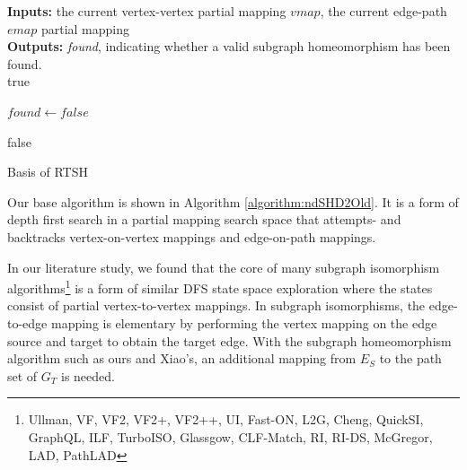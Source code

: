 \begin{algorithm}
\DontPrintSemicolon
\SetAlgoLined
\LinesNumbered
\textbf{Inputs: } the current vertex-vertex partial mapping $\mathit{vmap}$, the current edge-path $\mathit{emap}$ partial mapping\\
\textbf{Outputs: } \textit{found}, indicating whether a valid subgraph homeomorphism has been found.\\

 {
	\Return true\;
}

$\mathit{found} \longleftarrow \mathit{false}$

 \Return false\;
 \caption{Basis of RTSH}
 \label{algorithm:ndSHD2Old}
\end{algorithm}






Our base algorithm is shown in Algorithm \ref{algorithm:ndSHD2Old}. It is a form of depth first search in a partial mapping search space that attempts- and backtracks vertex-on-vertex mappings and edge-on-path mappings.

In our literature study, we found that the core of many subgraph isomorphism algorithms\footnote{Ullman, VF, VF2, VF2+, VF2++, UI, Fast-ON, L2G, Cheng, QuickSI, GraphQL, ILF, TurboISO, Glassgow, CLF-Match, RI, RI-DS, McGregor, LAD, PathLAD} is a form of similar DFS state space exploration where the states consist of partial vertex-to-vertex mappings. In subgraph isomorphisms, the edge-to-edge mapping is elementary by performing the vertex mapping on the edge source and target to obtain the target edge. With the subgraph homeomorphism algorithm such as ours and Xiao's, an additional mapping from $E_S$ to the path set of $G_T$ is needed.

